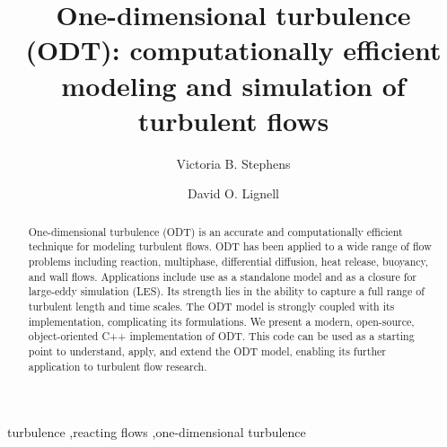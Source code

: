 \documentclass[preprint,12pt, a4paper]{elsarticle}
\begin{document}
\begin{frontmatter}



\title{One-dimensional turbulence (ODT): computationally efficient modeling and simulation of turbulent  flows}


\author{Victoria B. Stephens}
\author{David O. Lignell}


\address{Chemical Engineering Department, Brigham Young University, Provo, UT 84602, USA}

\begin{abstract}
%
One-dimensional turbulence (ODT) is an accurate and computationally efficient technique for modeling turbulent flows. ODT has been applied to a wide range of flow problems including reaction, multiphase, differential diffusion, heat release, buoyancy, and wall flows. Applications include use as a standalone model and as a closure for large-eddy simulation (LES). Its strength lies in the ability to capture a full range of turbulent length and time scales. The ODT model is strongly coupled with its implementation, complicating its formulations. We present a modern, open-source, object-oriented C++ implementation of ODT. This code can be used as a starting point to understand, apply, and extend the ODT model, enabling its further application to turbulent flow research.
%
\end{abstract}

\begin{keyword}
turbulence \sep reacting flows \sep one-dimensional turbulence

\end{keyword}

\end{frontmatter}
\end{document}
